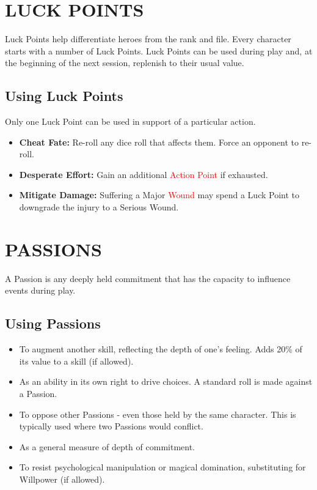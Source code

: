 \documentclass[10pt]{article}
\begin{document}
\section{LUCK POINTS}
\label{sec:luck}
Luck Points help differentiate heroes from the rank and file. Every character starts with a number of Luck Points. Luck Points can be used during play and, at the beginning of the next session, replenish to their usual value.

\subsection{Using Luck Points}
Only one Luck Point can be used in support of a particular action.
\begin{itemize}[leftmargin=*]
    \item \textbf{Cheat Fate:} Re-roll any dice roll that affects them. Force an opponent to re-roll.
    \item \textbf{Desperate Effort:} Gain an additional \textcolor{red}{Action Point} if exhausted.
    \item \textbf{Mitigate Damage:} Suffering a Major \textcolor{red}{Wound} may spend a Luck Point to downgrade the injury to a Serious Wound.
\end{itemize}


\section{PASSIONS}
\label{sec:passions}
A Passion is any deeply held commitment that has the capacity to influence events during play.

\subsection{Using Passions}
\begin{itemize}[leftmargin=*]
    \item To augment another skill, reflecting the depth of one's feeling. Adds 20\% of its value to a skill (if allowed).
    \item As an ability in its own right to drive choices. A standard roll is made against a Passion.
    \item To oppose other Passions - even those held by the same character. This is typically used where two Passions would conflict.
    \item As a general measure of depth of commitment.
    \item To resist psychological manipulation or magical domination, substituting for Willpower (if allowed).
\end{itemize}
\end{document}
